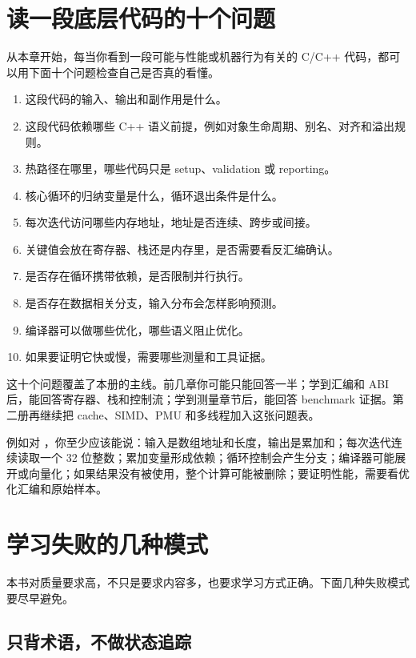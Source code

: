 \section{读一段底层代码的十个问题}

从本章开始，每当你看到一段可能与性能或机器行为有关的 C/C++ 代码，都可以用下面十个问题检查自己是否真的看懂。

\begin{enumerate}
  \item 这段代码的输入、输出和副作用是什么。
  \item 这段代码依赖哪些 C++ 语义前提，例如对象生命周期、别名、对齐和溢出规则。
  \item 热路径在哪里，哪些代码只是 setup、validation 或 reporting。
  \item 核心循环的归纳变量是什么，循环退出条件是什么。
  \item 每次迭代访问哪些内存地址，地址是否连续、跨步或间接。
  \item 关键值会放在寄存器、栈还是内存里，是否需要看反汇编确认。
  \item 是否存在循环携带依赖，是否限制并行执行。
  \item 是否存在数据相关分支，输入分布会怎样影响预测。
  \item 编译器可以做哪些优化，哪些语义阻止优化。
  \item 如果要证明它快或慢，需要哪些测量和工具证据。
\end{enumerate}

这十个问题覆盖了本册的主线。前几章你可能只能回答一半；学到汇编和 ABI 后，能回答寄存器、栈和控制流；学到测量章节后，能回答 benchmark 证据。第二册再继续把 cache、SIMD、PMU 和多线程加入这张问题表。

例如对 ，你至少应该能说：输入是数组地址和长度，输出是累加和；每次迭代连续读取一个 32 位整数；累加变量形成依赖；循环控制会产生分支；编译器可能展开或向量化；如果结果没有被使用，整个计算可能被删除；要证明性能，需要看优化汇编和原始样本。

\section{学习失败的几种模式}

本书对质量要求高，不只是要求内容多，也要求学习方式正确。下面几种失败模式要尽早避免。

\subsection{只背术语，不做状态追踪}


